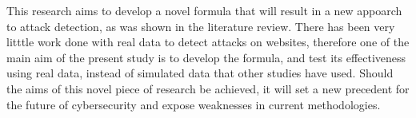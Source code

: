 
This research aims to develop a novel formula that will result in a new appoarch to attack detection, as was shown in the literature review. There has been very litttle work done with real data to detect attacks on websites, therefore one of the main aim of the present study is to develop the formula, and test its effectiveness using real data, instead of simulated data that other studies have used. Should the aims of this novel piece of research be achieved, it will set a new precedent for the future of cybersecurity and expose weaknesses in current methodologies.